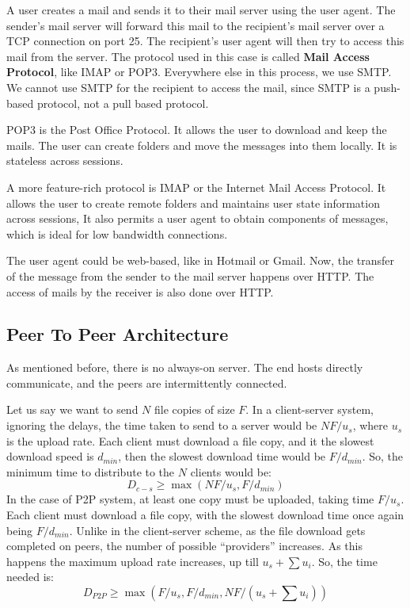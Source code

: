\documentclass[12pt,letterpaper]{article}
\theoremstyle{definition}
\begin{document}
A user creates a mail and sends it to their mail server using the user agent. The sender's mail server will forward this mail to the recipient's mail server over a TCP connection on port 25. The recipient's user agent will then try to access this mail from the server. The protocol used in this case is called \textbf{Mail Access Protocol}, like IMAP or POP3. Everywhere else in this process, we use SMTP. We cannot use SMTP for the recipient to access the mail, since SMTP is a push-based protocol, not a pull based protocol.

POP3 is the Post Office Protocol. It allows the user to download and keep the mails. The user can create folders and move the messages into them locally. It is stateless across sessions.

A more feature-rich protocol is IMAP or the Internet Mail Access Protocol. It allows the user to create remote folders and maintains user state information across sessions, It also permits a user agent to obtain components of messages, which is ideal for low bandwidth connections.

The user agent could be web-based, like in Hotmail or Gmail. Now, the transfer of the message from the sender to the mail server happens over HTTP. The access of mails by the receiver is also done over HTTP.

\subsection{Peer To Peer Architecture}

As mentioned before, there is no always-on server. The end hosts directly communicate, and the peers are intermittently connected.

Let us say we want to send $N$ file copies of size $F$. In a client-server system, ignoring the delays, the time taken to send to a server would be $NF/u_s$, where $u_s$ is the upload rate. Each client must download a file copy, and it the slowest download speed is $d_{min}$, then the slowest download time would be $F/d_{min}$. So, the minimum time to distribute to the $N$ clients would be:
\[D_{c-s} \geq \max(NF/u_s,F/d_{min})\]
In the case of P2P system, at least one copy must be uploaded, taking time $F/u_s$. Each client must download a file copy, with the slowest download time once again being $F/d_{min}$. Unlike in the client-server scheme, as the file download gets completed on peers, the number of possible ``providers'' increases. As this happens the maximum upload rate increases, up till $u_s +\sum u_i$. So, the time needed is:
\[D_{P2P} \geq \max(F/u_s,F/d_{min},NF/(u_s+ \sum u_i))\]
\end{document}
